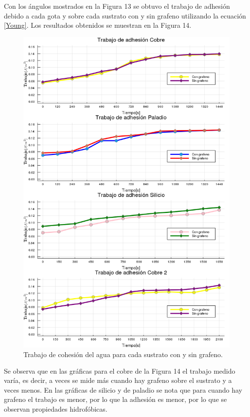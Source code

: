 \documentclass[twocolumn,letterpaper,aps,pra,10pt]{revtex4-1}
\begin{document}
Con los ángulos mostrados en la Figura 13 se obtuvo el trabajo de adhesión debido a cada gota y sobre cada sustrato con y sin grafeno utilizando la ecuación \eqref{Young}. Los resultados obtenidos se muestran en la Figura 14.

\begin{figure}[h]
\centering
\includegraphics[scale=0.25]{graficas_Trabajo.png}
\caption{Trabajo de cohesión del agua para cada sustrato con y sin grafeno.}
\end{figure}

Se observa que en las gráficas para el cobre de la Figura 14 el trabajo medido varía, es decir, a veces se mide más cuando hay grafeno sobre el sustrato y a veces menos. En las gráficas de silicio y de paladio se nota que para cuando hay grafeno el trabajo es menor, por lo que la adhesión es menor, por lo que se observan propiedades hidrofóbicas.
\end{document}
